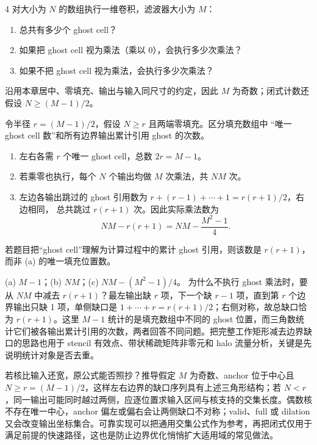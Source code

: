 \begin{solutionexercise}{4}
\problemheading 对大小为 $N$ 的数组执行一维卷积，滤波器大小为 $M$：
\begin{enumerate}[label=\alph*.,leftmargin=2.2em]
  \item 总共有多少个 ghost cell？
  \item 如果把 ghost cell 视为乘法（乘以 0），会执行多少次乘法？
  \item 如果不把 ghost cell 视为乘法，会执行多少次乘法？
\end{enumerate}
沿用本章居中、零填充、输出与输入同尺寸的约定，因此 $M$ 为奇数；闭式计数还假设
$N\ge (M-1)/2$。

\approachheading 令半径 $r=(M-1)/2$，假设 $N\ge r$ 且两端零填充。区分填充数组中
“唯一 ghost cell 数”和所有边界输出累计引用 ghost 的次数。

\answerheading
\begin{enumerate}[label=\alph*.,leftmargin=2.2em]
\item 左右各需 $r$ 个唯一 ghost cell，总数 $2r=M-1$。
\item 若乘零也执行，每个 $N$ 个输出均做 $M$ 次乘法，共 $NM$ 次。
\item 左边各输出跳过的 ghost 引用数为 $r+(r-1)+\cdots+1=r(r+1)/2$，右边相同，
总共跳过 $r(r+1)$ 次。因此实际乘法数为
\[
 NM-r(r+1)=NM-\frac{M^2-1}{4}.
\]
\end{enumerate}
若题目把“ghost cell”理解为计算过程中的累计 ghost 引用，则该数是 $r(r+1)$，
而非 (a) 的唯一填充位置数。

\conclusionheading (a) $M-1$；(b) $NM$；(c) $NM-(M^2-1)/4$。
\discussionheading
{}
为什么不执行 ghost 乘法时，要从 $NM$ 中减去 $r(r+1)$？最左输出缺 $r$ 项，下一个缺 $r-1$ 项，直到第 $r$ 个边界输出只缺 1 项，单侧缺口是 $1+\cdots+r=r(r+1)/2$；右侧对称，故总缺口恰为 $r(r+1)$。这里 $M-1$ 统计的是填充数组中不同的 ghost 位置，而三角数统计它们被各输出累计引用的次数，两者回答不同问题。把完整工作矩形减去边界缺口的思路也用于 stencil 有效点、带状稀疏矩阵非零元和 halo 流量分析，关键是先说明统计对象是否去重。

若核比输入还宽，原公式能否照抄？推导假定 $M$ 为奇数、anchor 位于中心且 $N\ge r=(M-1)/2$，这样左右边界的缺口序列具有上述三角形结构；若 $N<r$，同一输出可能同时越过两侧，应逐位置求输入区间与核支持的交集长度。偶数核不存在唯一中心，anchor 偏左或偏右会让两侧缺口不对称；valid、full 或 dilation 又会改变输出坐标集合。可靠实现可以把通用交集公式作为参考，再把闭式仅用于满足前提的快速路径，这也是防止边界优化悄悄扩大适用域的常见做法。


\end{solutionexercise}
